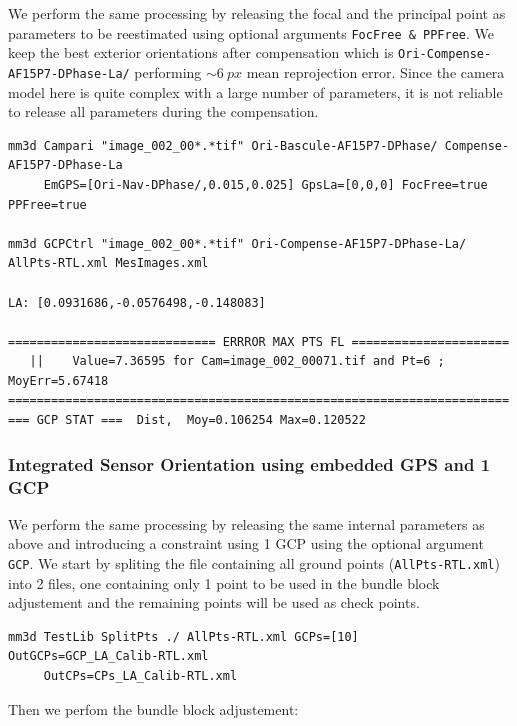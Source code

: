 We perform the same processing by releasing the focal and the principal point as parameters to be reestimated using optional arguments {\tt FocFree \& PPFree}. We keep the best exterior orientations after compensation which is {\tt Ori-Compense-AF15P7-DPhase-La/} performing $\sim 6\ px$ mean reprojection error. Since the camera model here is quite complex with a large number of parameters, it is not reliable to release all parameters during the compensation.
\begin{verbatim}
mm3d Campari "image_002_00*.*tif" Ori-Bascule-AF15P7-DPhase/ Compense-AF15P7-DPhase-La 
     EmGPS=[Ori-Nav-DPhase/,0.015,0.025] GpsLa=[0,0,0] FocFree=true PPFree=true
     
mm3d GCPCtrl "image_002_00*.*tif" Ori-Compense-AF15P7-DPhase-La/ AllPts-RTL.xml MesImages.xml

LA: [0.0931686,-0.0576498,-0.148083]

============================= ERRROR MAX PTS FL ======================
   ||    Value=7.36595 for Cam=image_002_00071.tif and Pt=6 ; MoyErr=5.67418
======================================================================
=== GCP STAT ===  Dist,  Moy=0.106254 Max=0.120522
\end{verbatim}


\subsubsection{Integrated Sensor Orientation using embedded GPS and 1 GCP}

We perform the same processing by releasing the same internal parameters as above and introducing a constraint using 1 GCP using the optional argument {\tt GCP}. 
We start by spliting the file containing all ground points ({\tt AllPts-RTL.xml}) into 2 files, one containing only 1 point to be used in the bundle block adjustement and the remaining points will be used as check points.

\begin{verbatim}
mm3d TestLib SplitPts ./ AllPts-RTL.xml GCPs=[10] OutGCPs=GCP_LA_Calib-RTL.xml 
     OutCPs=CPs_LA_Calib-RTL.xml
\end{verbatim}

Then we perfom the bundle block adjustement:

